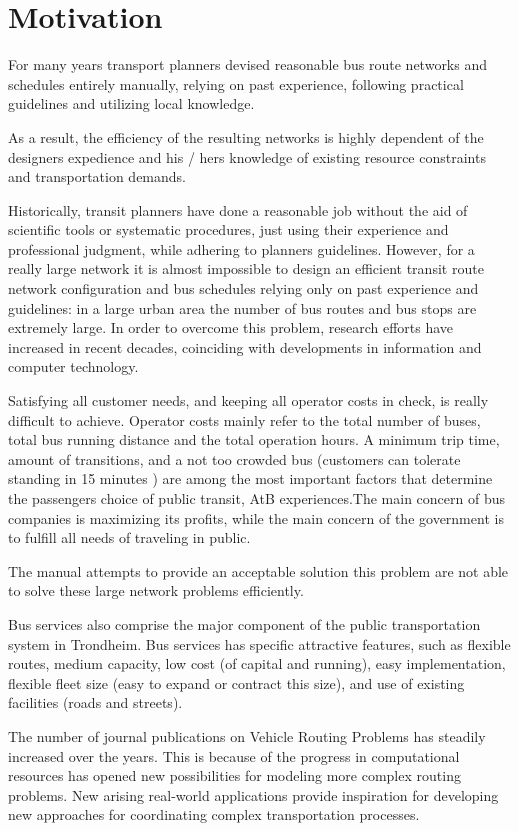 \section{Motivation} 

 For many years transport planners devised reasonable bus route networks and schedules entirely manually, relying on past experience, following practical guidelines and utilizing local knowledge.

 As a result, the efficiency of the resulting networks is highly dependent of the designers expedience and his / hers knowledge of existing resource constraints and transportation demands. 

 Historically, transit planners have done a reasonable job without the aid of scientific tools or systematic procedures, just using their experience and professional judgment, while adhering to planners guidelines. However, for a really large network it is almost impossible to design an efficient transit route network configuration and bus schedules relying only on past experience and guidelines: in a large urban area the number of bus routes and bus stops are extremely large. In order to overcome this problem, research efforts have increased in recent decades, coinciding with developments in information and computer technology. 

 Satisfying all customer needs, and keeping all operator costs in check, is really difficult to achieve. Operator costs mainly refer to the total number of buses, total bus running distance and the total operation hours. A minimum trip time, amount of transitions, and a not too crowded bus (customers can tolerate standing in 15 minutes ) are among the most important factors that determine the passengers choice of public transit, AtB experiences.The main concern of bus companies is maximizing its profits, while the main concern of the government is to fulfill all needs of traveling in public. 

 The manual attempts to provide an acceptable solution this problem are not able to solve these large network problems efficiently.

 Bus services also comprise the major component of the public transportation system in Trondheim. Bus services has specific attractive features, such as flexible routes, medium capacity, low cost (of capital and running), easy implementation, flexible fleet size (easy to expand or contract this size), and use of existing facilities (roads and streets). 

 The number of journal publications on Vehicle Routing Problems has steadily increased over the years. This is because of the progress in computational resources has opened new possibilities for modeling more complex routing problems. New arising real-world applications provide inspiration for developing new approaches for coordinating complex transportation processes.  \citep{vehiclerouting}

